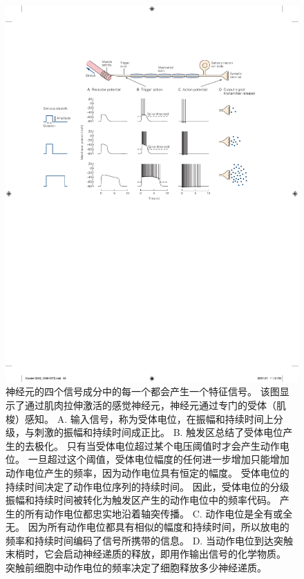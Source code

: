 \begin{figure}[htbp]
	\centering
	\includegraphics[width=1.0\linewidth]{chap03/fig_3_9}
	\caption{神经元的四个信号成分中的每一个都会产生一个特征信号。 
		该图显示了通过肌肉拉伸激活的感觉神经元，神经元通过专门的受体（肌梭）感知。 
		A. 输入信号，称为受体电位，在振幅和持续时间上分级，与刺激的振幅和持续时间成正比。 
		B. 触发区总结了受体电位产生的去极化。 
		只有当受体电位超过某个电压阈值时才会产生动作电位。 
		一旦超过这个阈值，受体电位幅度的任何进一步增加只能增加动作电位产生的频率，因为动作电位具有恒定的幅度。 
		受体电位的持续时间决定了动作电位序列的持续时间。 
		因此，受体电位的分级振幅和持续时间被转化为触发区产生的动作电位中的频率代码。 
		产生的所有动作电位都忠实地沿着轴突传播。 
		C. 动作电位是全有或全无。 
		因为所有动作电位都具有相似的幅度和持续时间，所以放电的频率和持续时间编码了信号所携带的信息。 
		D. 当动作电位到达突触末梢时，它会启动神经递质的释放，即用作输出信号的化学物质。 
		突触前细胞中动作电位的频率决定了细胞释放多少神经递质。}
	\label{fig:3_9}
\end{figure}

